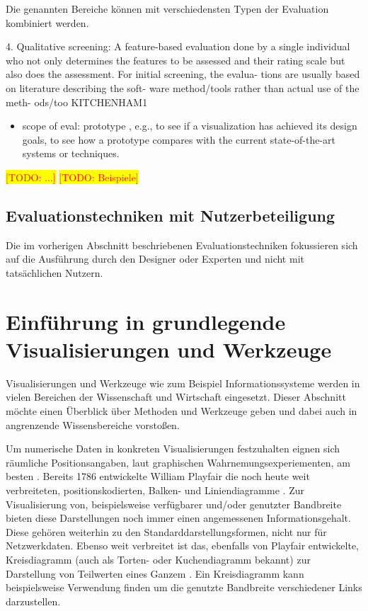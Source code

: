 \documentclass[draft=false
              ,paper=a4
              ,twoside=false
              ,fontsize=11pt
              ,headsepline
              ,BCOR10mm
              ,DIV11
              ]{scrbook}
\newcommand{\TODO}[1]{\colorbox{yellow}{\textcolor{red}{[TODO: #1]}}}
\begin{document}
Die genannten Bereiche können mit verschiedensten Typen der Evaluation kombiniert werden.

4. Qualitative screening: A feature-based evaluation done by a  single individual who not only determines the features to be assessed and their rating scale but also does the assessment. For  initial screening, the evalua- tions are usually based  on literature describing the soft- ware method/tools rather than actual use of the meth- ods/too KITCHENHAM1

\begin{itemize}
  \item scope of eval: prototype , e.g., to see if a visualization has achieved
its design goals, to see how a prototype compares with
the current state-of-the-art systems or techniques.
\end{itemize}
\TODO{...}
\TODO{Beispiele}
\fi %

\subsection{Evaluationstechniken mit Nutzerbeteiligung} %
\label{sub:evaluationstechniken_mit_nutzerbeteiligung}
Die im vorherigen Abschnitt beschriebenen Evaluationstechniken fokussieren sich auf die Ausführung durch den Designer oder Experten und nicht mit tatsächlichen Nutzern.

\section{Einführung in grundlegende Visualisierungen und Werkzeuge} %
\label{sec:visualisierungen_und_werkzeuge}

Visualisierungen und Werkzeuge wie zum Beispiel Informationssysteme werden in vielen Bereichen der Wissenschaft und Wirtschaft eingesetzt. Dieser Abschnitt möchte einen Überblick über Methoden und Werkzeuge geben und dabei auch in angrenzende Wissensbereiche vorstoßen. 

Um numerische Daten in konkreten Visualisierungen festzuhalten eignen sich räumliche Positionsangaben, laut graphischen Wahrnemungsexperiementen, am besten \cite{heer_tour_2010}. Bereits 1786 entwickelte William Playfair die noch heute weit verbreiteten, positionskodierten, Balken- und Liniendiagramme \cite{playfair_playfairs_1768}. Zur Visualisierung von, beispielsweise verfügbarer und/oder genutzter Bandbreite bieten diese Darstellungen noch immer einen angemessenen Informationsgehalt. Diese gehören weiterhin zu den Standarddarstellungsformen, nicht nur für Netzwerkdaten. Ebenso weit verbreitet ist das, ebenfalls von Playfair entwickelte, Kreisdiagramm (auch als Torten- oder Kuchendiagramm bekannt) zur Darstellung von Teilwerten eines Ganzem \cite{playfair_statistical_1801}. Ein Kreisdiagramm kann beispielsweise Verwendung finden um die genutzte Bandbreite verschiedener Links darzustellen. 
\end{document}
